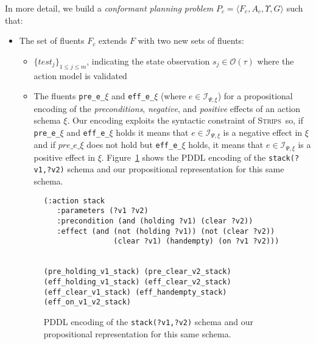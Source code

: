 \documentclass{article}
\newcommand{\tup}[1]{{\langle #1 \rangle}}
\newcommand{\strips}{\textsc{Strips}}
\begin{document}
In more detail, we build a {\em conformant planning problem} $P_c=\tup{F_c,A_c,\Upsilon,G}$ such that:
\begin{itemize}
\item The set of fluents $F_c$ extends $F$ with two new sets of fluents:
      \begin{itemize}
      \item $\{test_j\}_{1\leq j\leq m}$, indicating the state observation $s_j\in\mathcal{O}(\tau)$ where the action model is validated
      \item The fluents {\tt\small pre\_e\_$\xi$} and {\tt\small eff\_e\_$\xi$} (where $e\in{\mathcal I}_{\Psi,\xi}$) for a propositional encoding of the {\em preconditions}, {\em negative}, and {\em positive} effects of an action schema $\xi$. Our encoding exploits the syntactic constraint of \strips\ so, if {\tt\small pre\_e\_$\xi$} and {\tt\small eff\_e\_$\xi$} holds it means that $e\in{\mathcal I}_{\Psi,\xi}$ is a negative effect in $\xi$ and if $pre\_e\_\xi$ does not hold but {\tt\small eff\_e\_$\xi$} holds, it means that $e\in{\mathcal I}_{\Psi,\xi}$ is a positive effect in $\xi$. Figure~\ref{fig:propositional} shows the PDDL encoding of the {\tt\small stack(?v1,?v2)} schema and our propositional representation for this same schema.
      \end {itemize}

\begin{figure}
  \begin{tiny}  
  \begin{verbatim}
(:action stack
   :parameters (?v1 ?v2)
   :precondition (and (holding ?v1) (clear ?v2))
   :effect (and (not (holding ?v1)) (not (clear ?v2))
                (clear ?v1) (handempty) (on ?v1 ?v2)))


(pre_holding_v1_stack) (pre_clear_v2_stack)
(eff_holding_v1_stack) (eff_clear_v2_stack)
(eff_clear_v1_stack) (eff_handempty_stack) (eff_on_v1_v2_stack)
  \end{verbatim}           
  \end{tiny}  
 \caption{\small PDDL encoding of the {\tt\small stack(?v1,?v2)} schema and our propositional representation for this same schema.}
\label{fig:propositional}
\end{figure}


\end{itemize}
\end{document}
